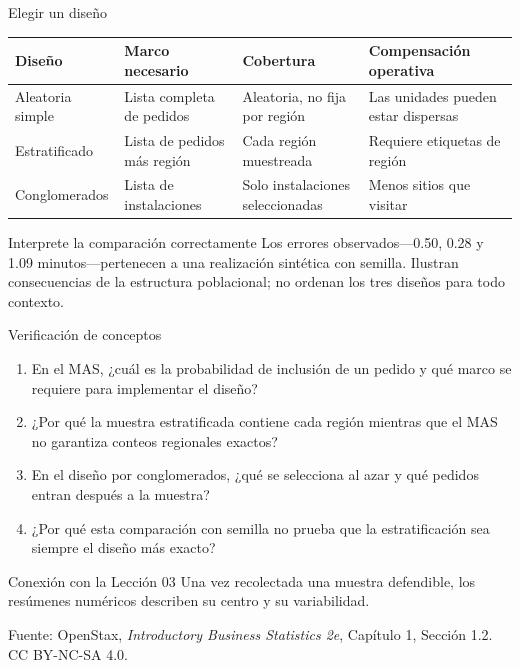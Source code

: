 \documentclass[aspectratio=169,10pt,spanish]{beamer}
\begin{document}
\begin{frame}{Elegir un diseño}
  \small
  \begin{center}
    \begin{tabular}{p{}p{}p{}p{}}
      \toprule
      \textbf{Diseño} & \textbf{Marco necesario} & \textbf{Cobertura} & \textbf{Compensación operativa} \\
      \midrule
      Aleatoria simple & Lista completa de pedidos & Aleatoria, no fija por región & Las unidades pueden estar dispersas \\
      Estratificado & Lista de pedidos más región & Cada región muestreada & Requiere etiquetas de región \\
      Conglomerados & Lista de instalaciones & Solo instalaciones seleccionadas & Menos sitios que visitar \\
      \bottomrule
    \end{tabular}
  \end{center}

  \vspace{0.8em}
  \begin{alertblock}{Interprete la comparación correctamente}
    Los errores observados---0.50, 0.28 y 1.09 minutos---pertenecen a una
    realización sintética con semilla. Ilustran consecuencias de la estructura
    poblacional; no ordenan los tres diseños para todo contexto.
  \end{alertblock}
\end{frame}

\begin{frame}{Verificación de conceptos}
  \begin{enumerate}
    \item En el MAS, ¿cuál es la probabilidad de inclusión de un pedido y qué
      marco se requiere para implementar el diseño?
    \item ¿Por qué la muestra estratificada contiene cada región mientras que
      el MAS no garantiza conteos regionales exactos?
    \item En el diseño por conglomerados, ¿qué se selecciona al azar y qué
      pedidos entran después a la muestra?
    \item ¿Por qué esta comparación con semilla no prueba que la estratificación
      sea siempre el diseño más exacto?
  \end{enumerate}

  \vspace{0.5em}
  \begin{block}{Conexión con la Lección 03}
    Una vez recolectada una muestra defendible, los resúmenes numéricos
    describen su centro y su variabilidad.
  \end{block}

  \vfill
  \scriptsize Fuente: OpenStax, \textit{Introductory Business Statistics 2e},
  Capítulo 1, Sección 1.2. CC BY-NC-SA 4.0.
\end{frame}

\appendix
\end{document}
